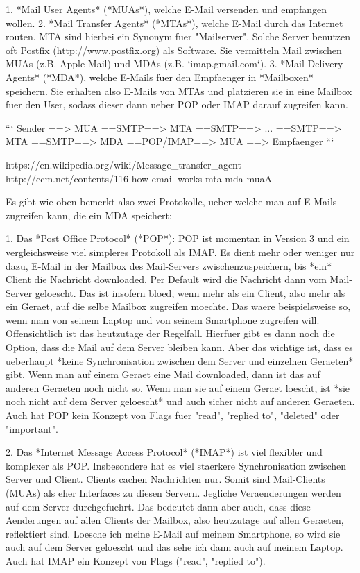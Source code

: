 1. *Mail User Agents* (*MUAs*), welche E-Mail versenden und empfangen wollen.
2. *Mail Transfer Agents* (*MTAs*), welche E-Mail durch das Internet routen. MTA
   sind hierbei ein Synonym fuer "Mailserver". Solche Server benutzen oft Postfix
   (http://www.postfix.org) als Software. Sie vermitteln Mail zwischen MUAs
   (z.B. Apple Mail) und MDAs (z.B. `imap.gmail.com`).
3. *Mail Delivery Agents* (*MDA*), welche E-Mails fuer den Empfaenger in
   *Mailboxen* speichern. Sie erhalten also E-Mails von MTAs und platzieren sie
   in eine Mailbox fuer den User, sodass dieser dann ueber POP oder IMAP darauf
   zugreifen kann.

```
Sender ==> MUA ==SMTP==> MTA ==SMTP==> ... ==SMTP==> MTA
	   ==SMTP==> MDA ==POP/IMAP==> MUA ==> Empfaenger
```

https://en.wikipedia.org/wiki/Message_transfer_agent
http://ccm.net/contents/116-how-email-works-mta-mda-muaA

Es gibt wie oben bemerkt also zwei Protokolle, ueber welche man auf E-Mails
zugreifen kann, die ein MDA speichert:

1. Das *Post Office Protocol* (*POP*): POP ist momentan in Version 3 und ein
   vergleichsweise viel simpleres Protokoll als IMAP. Es dient mehr oder weniger
   nur dazu, E-Mail in der Mailbox des Mail-Servers zwischenzuspeichern, bis
   *ein* Client die Nachricht downloaded. Per Default wird die Nachricht dann
   vom Mail-Server geloescht. Das ist insofern bloed, wenn mehr als ein Client,
   also mehr als ein Geraet, auf die selbe Mailbox zugreifen moechte. Das waere
   beispielsweise so, wenn man von seinem Laptop und von seinem Smartphone
   zugreifen will. Offensichtlich ist das heutzutage der Regelfall. Hierfuer
   gibt es dann noch die Option, dass die Mail auf dem Server bleiben kann. Aber
   das wichtige ist, dass es ueberhaupt *keine Synchronisation zwischen dem
   Server und einzelnen Geraeten* gibt. Wenn man auf einem Geraet eine Mail
   downloaded, dann ist das auf anderen Geraeten noch nicht so. Wenn man sie auf
   einem Geraet loescht, ist *sie noch nicht auf dem Server geloescht* und auch
   sicher nicht auf anderen Geraeten. Auch hat POP kein Konzept von Flags fuer
   "read", "replied to", "deleted" oder "important".

2. Das *Internet Message Access Protocol* (*IMAP*) ist viel flexibler und
   komplexer als POP. Insbesondere hat es viel staerkere Synchronisation
   zwischen Server und Client. Clients cachen Nachrichten nur. Somit sind
   Mail-Clients (MUAs) als eher Interfaces zu diesen Servern. Jegliche
   Veraenderungen werden auf dem Server durchgefuehrt. Das bedeutet dann aber
   auch, dass diese Aenderungen auf allen Clients der Mailbox, also heutzutage
   auf allen Geraeten, reflektiert sind. Loesche ich meine E-Mail auf meinem
   Smartphone, so wird sie auch auf dem Server geloescht und das sehe ich dann
   auch auf meinem Laptop. Auch hat IMAP ein Konzept von Flags ("read", "replied
   to").

